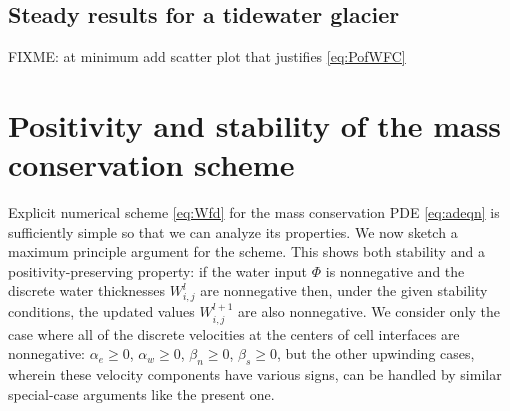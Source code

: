 \documentclass[11pt,final]{amsart}%
\newcommand{\Wlij}{W^l_{i,j}}
\begin{document}
\subsection*{Steady results for a tidewater glacier}

FIXME:  at minimum add scatter plot that justifies \eqref{eq:PofWFC}



\clearpage\newpage

\small

\normalsize

\clearpage\newpage
\appendix

\section{Positivity and stability of the mass conservation scheme}

Explicit numerical scheme \eqref{eq:Wfd} for the mass conservation PDE \eqref{eq:adeqn} is sufficiently simple so that we can analyze its properties.  We now sketch a maximum principle argument \citep{MortonMayers} for the scheme.  This shows both stability and a positivity-preserving property: if the water input $\Phi$ is nonnegative and the discrete water thicknesses $\Wlij$ are nonnegative then, under the given stability conditions, the updated values $W_{i,j}^{l+1}$ are also nonnegative.    We consider only the case where all of the discrete velocities at the centers of cell interfaces are nonnegative: $\alpha_e\ge 0$, $\alpha_w\ge 0$, $\beta_n\ge 0$, $\beta_s\ge 0$, but the other upwinding cases, wherein these velocity components have various signs, can be handled by similar special-case arguments like the present one.
\end{document}

